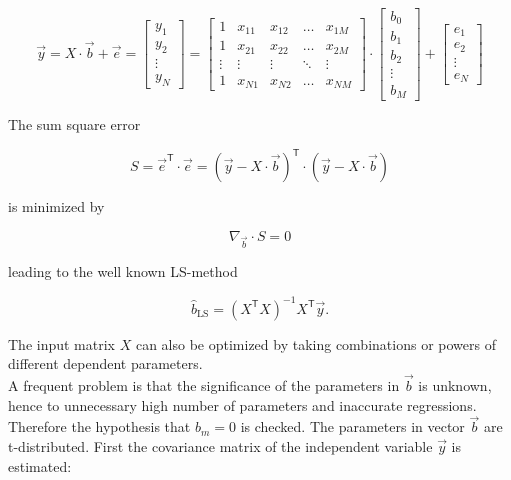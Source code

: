 \begin{equation}
\vec{y}=X\cdot \vec{b}+\vec{e}=\begin{bmatrix}
y_1 \\ y_2 \\ \vdots \\ y_N
\end{bmatrix} = \begin{bmatrix}
1 & x_{11} & x_{12} & \dots & x_{1M} \\
1 & x_{21} & x_{22} & \dots & x_{2M} \\
\vdots & \vdots & \vdots & \ddots & \vdots \\
1 & x_{N1} & x_{N2} & \dots & x_{NM}
\end{bmatrix} \cdot \begin{bmatrix}
b_0 \\ b_1 \\ b_2 \\ \vdots \\ b_M
\end{bmatrix} + \begin{bmatrix}
e_1 \\ e_2 \\ \vdots \\ e_N
\end{bmatrix}
\end{equation}

The sum square error

\begin{equation}
S = \vec{e}^{\mathsf T}\cdot\vec{e}=\left(\vec{y}-X\cdot\vec{b}\right)^{\mathsf T}\cdot\left(\vec{y}-X\cdot\vec{b}\right)
\end{equation}

is minimized by 

\begin{equation}
\nabla_{\vec{b}}\cdot S = 0
\end{equation}

leading to the well known \ac{LS}-method

\begin{equation}
\hat{b}_\text{LS}=\left(X^{\mathsf T} X\right)^{-1} X^{\mathsf T}\vec{y}.
\end{equation}

The input matrix $X$ can also be optimized by taking combinations or powers of different dependent parameters.\\
A frequent problem is that the significance of the parameters in $\vec{b}$ is unknown, hence to unnecessary high number of parameters and inaccurate regressions. Therefore the hypothesis that $b_m=0$ is checked. The parameters in vector $\vec{b}$ are t-distributed. First the covariance matrix of the independent variable $\vec{y}$ is estimated: \cite{dffs}

